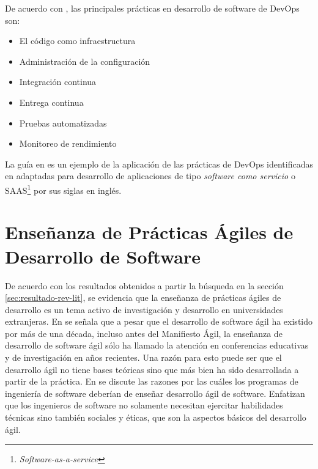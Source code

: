 \documentclass[journal]{IEEEtran}
\begin{document}
De acuerdo con \cite{jabbari-et-al}, las principales prácticas en desarrollo de software de DevOps son:
\begin{itemize}
    \item El código como infraestructura
    \item Administración de la configuración
    \item Integración continua
    \item Entrega continua
    \item Pruebas automatizadas
    \item Monitoreo de rendimiento
\end{itemize}
La guía en \cite{wiggins} es un ejemplo de la aplicación de las prácticas de DevOps identificadas en \cite{jabbari-et-al} adaptadas para desarrollo de aplicaciones de tipo \emph{software como servicio} o SAAS\footnote{\emph{Software-as-a-service}} por sus siglas en inglés.


\section{Enseñanza de Prácticas Ágiles de Desarrollo de Software}
De acuerdo con los resultados obtenidos a partir la búsqueda en la sección \ref{sec:resultado-rev-lit}, se evidencia que la enseñanza de prácticas ágiles de desarrollo es un tema activo de investigación y desarrollo en universidades extranjeras. En \cite{kropp-meier-1} se señala que a pesar que el desarrollo de software ágil ha existido por más de una década, incluso antes del Manifiesto Ágil, la enseñanza de desarrollo de software ágil sólo ha llamado la atención en conferencias educativas y de investigación en años recientes. Una razón para esto puede ser que el desarrollo ágil no tiene bases teóricas sino que más bien ha sido desarrollada a partir de la práctica. En \cite{hazzan-dubinsky} se discute las razones por las cuáles los programas de ingeniería de software deberían de enseñar desarrollo ágil de software. Enfatizan que los ingenieros de software no solamente necesitan ejercitar habilidades técnicas sino también sociales y éticas, que son la aspectos básicos del desarrollo ágil.
\end{document}
